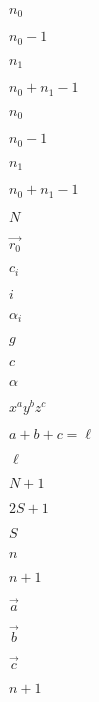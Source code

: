 \documentclass{article}
\begin{document}
$n_0$
\pagebreak

$n_0 -1$
\pagebreak

$n_1$
\pagebreak

$n_0 + n_1 - 1$
\pagebreak

$n_{0}$
\pagebreak

$n_{0} -1$
\pagebreak

$n_{1}$
\pagebreak

$n_0 + n_1 -1$
\pagebreak

$N$
\pagebreak

$\vec{r_0}$
\pagebreak

$c_i$
\pagebreak

$i$
\pagebreak

$\alpha_i$
\pagebreak

$g$
\pagebreak

$c$
\pagebreak

$\alpha$
\pagebreak

$x^ay^bz^c$
\pagebreak

$a+b+c = \ell$
\pagebreak

$\ell$
\pagebreak

$N+1$
\pagebreak

$2S+1$
\pagebreak

$S$
\pagebreak

$n$
\pagebreak

$n + 1 $
\pagebreak

$\vec{a}$
\pagebreak

$\vec{b}$
\pagebreak

$\vec{c}$
\pagebreak

$n + 1$
\pagebreak
\end{document}

